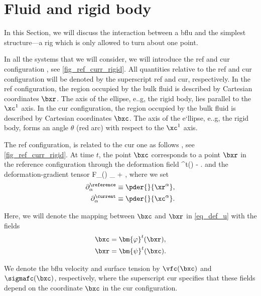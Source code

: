 \section{Fluid and rigid body}\label{sec_fl_rigid}

In this Section, we will discuss the interaction between a  \ac{bflu} and the simplest structure---a  \ac{rig} which is only allowed to turn about one point.


In all the systems that we will consider, we will introduce the \ac{ref} and \ac{cur} configuration \cite{kamenskyLectureNotesMAE,landauTheoryElasticity1986,slaughterLinearizedTheoryElasticity2002}, see \cref{fig_ref_curr_rigid}. All quantities relative to the \ac{ref} and \ac{cur} configuration will be denoted by the superscript \ac{ref} and \ac{cur}, respectively.
In the \ac{ref} configuration, the region occupied by the bulk fluid is described by Cartesian coordinates $\bxr$. The  axis of the ellipse, e..g, the rigid body, lies parallel to the $\xc^1$ axis.
In the \ac{cur} configuration, the region occupied by the bulk fluid is described by Cartesian coordinates $\bxc$. The  axis of the e`llipse, e..g, the rigid body, forms an angle  $\theta$ (red arc) with respect to the $\xc^1$ axis.


The \ac{ref} configuration, is related to the \ac{cur} one as follows \cite{kamenskyLectureNotesMAE}, see \cref{fig_ref_curr_rigid}. At  time $t$, the point $\bxc$  corresponds to a point $\bxr$ in the reference configuration through the deformation field \cite{landauFluidMechanics1987}
\be\label{eq_def_u}
\budom^t(\bxr) \equiv \bxc - \bxr.
\ee
and the deformation-gradient tensor
\be
\label{eq_def_F}
F_{\alpha \beta}(\bu) \equiv \delta_{\alpha \beta} + ,
\ee
where we set
\begin{align}\label{eq_def_pder_ref}
    \partial^\reference_\alpha & \equiv \pder{}{\xr^\alpha}, \\
    \label{eq_def_pder_cur}
    \partial^\current_\alpha   & \equiv \pder{}{\xc^\alpha}.
\end{align}

Here, we will denote the mapping between $\bxc$ and $\bxr$ in \cref{eq_def_u} with the fields
\begin{align}\label{eq_def_phi}
    \bxc & = \bm{\varphi}^t(\bxr), \\
    \label{eq_def_psi}
    \bxr & = \bm{\psi}^t(\bxc).
\end{align}

We denote the \ac{bflu} velocity and surface tension by $\vfc(\bxc)$ and $\sigmafc(\bxc)$, respectively, where the superscript \ac{cur} specifies that these fields depend on the coordinate $\bxc$ in the \ac{cur} configuration.


